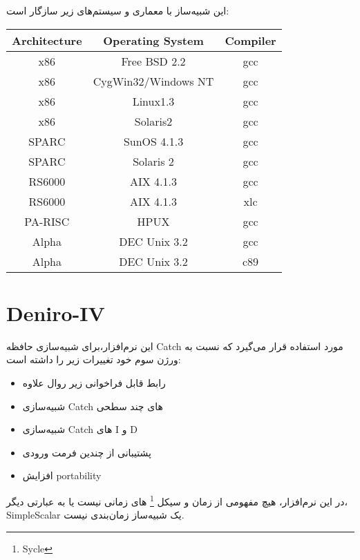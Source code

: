 \documentclass[12pt]{exam}
\begin{document}
\begin{multicols}{2}
	این شبیه‌ساز با معماری و سیستم‌های زیر سازگار است:
	\begin{latin}
		\begin{center}
			\small\addtolength{\tabcolsep}{-5pt}
			\begin{tabular}{||c c c||} 
				\hline
				Architecture & Operating System & Compiler \\ [0.5ex] 
				\hline\hline
				x86 & Free BSD 2.2 & gcc \\ 
				\hline
				x86 & CygWin32/Windows NT & gcc \\
				\hline
				x86 & Linux1.3 & gcc \\
				\hline
				x86 & Solaris2 & gcc \\
				\hline
				SPARC & SunOS 4.1.3 & gcc \\ 
				\hline
				
				SPARC & Solaris 2 & gcc \\
				\hline
				RS6000 & AIX 4.1.3 & gcc \\
				\hline
				RS6000 & AIX 4.1.3 & xlc \\
				\hline
				PA-RISC & HPUX & gcc \\
				\hline
				Alpha & DEC Unix 3.2 & gcc \\
				\hline
				Alpha & DEC Unix 3.2 & c89 \\ [1ex] 
				\hline
			\end{tabular}
		\end{center}
	\end{latin}
	
	
	
	\section{Deniro-IV}
	این نرم‌افزار،‌برای شبیه‌سازی حافظه Catch مورد استفاده قرار می‌گیرد که نسبت به ورژن سوم خود تغییرات زیر را داشته است:
	\begin{itemize}
		\item رابط قابل فراخوانی زیر روال علاوه
		\item شبیه‌سازی Catch های چند سطحی
		\item شبیه‌سازی Catch های I و D
		\item پشتیبانی از چندین فرمت ورودی
		\item افزایش portability
	\end{itemize}
	
	در این نرم‌افزار، هیچ مفهومی از زمان و سیکل \footnote{Sycle} های زمانی نیست یا به عبارتی دیگر، SimpleScalar یک شبیه‌ساز زمان‌بندی نیست.
	

\end{multicols}
\end{document}

